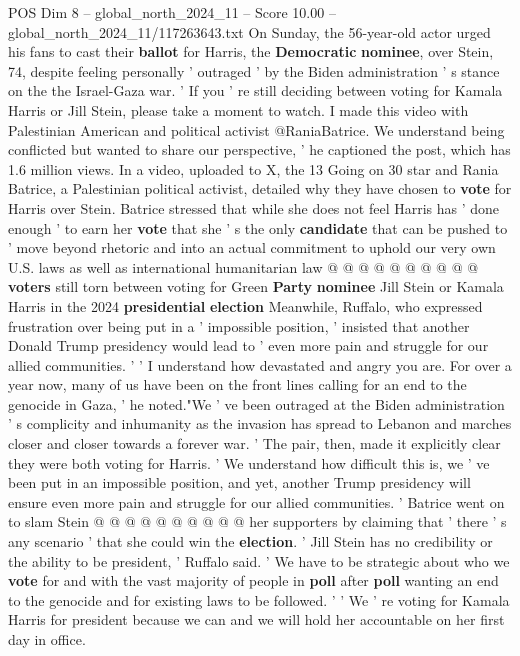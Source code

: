 \begin{textsample}{POS Dim 8 – global\_north\_2024\_11 – Score 10.00 – global\_north\_2024\_11/117263643.txt}  \label{ex:f8_pos_157}
On Sunday, the 56-year-old actor urged his fans to cast their \textbf{ballot} for Harris, the \textbf{Democratic} \textbf{nominee}, over Stein, 74, despite feeling personally ' outraged ' by the Biden administration ' s stance on the the Israel-Gaza war. ' If you ' re still deciding between voting for Kamala Harris or Jill Stein, please take a moment to watch.
I made this video with Palestinian American and political activist @RaniaBatrice.
We understand being conflicted but wanted to share our perspective, ' he captioned the post, which has 1.6 million views.
In a video, uploaded to X, the 13 Going on 30 star and Rania Batrice, a Palestinian political activist, detailed why they have chosen to \textbf{vote} for Harris over Stein.
Batrice stressed that while she does not feel Harris has ' done enough ' to earn her \textbf{vote} that she ' s the only \textbf{candidate} that can be pushed to ' move beyond rhetoric and into an actual commitment to uphold our very own U.S. laws as well as international humanitarian law @ @ @ @ @ @ @ @ @ @ \textbf{voters} still torn between voting for Green \textbf{Party} \textbf{nominee} Jill Stein or Kamala Harris in the 2024 \textbf{presidential} \textbf{election} Meanwhile, Ruffalo, who expressed frustration over being put in a ' impossible position, ' insisted that another Donald Trump presidency would lead to ' even more pain and struggle for our allied communities. ' ' I understand how devastated and angry you are.
For over a year now, many of us have been on the front lines calling for an end to the genocide in Gaza, ' he noted."We ' ve been outraged at the Biden administration ' s complicity and inhumanity as the invasion has spread to Lebanon and marches closer and closer towards a forever war. ' The pair, then, made it explicitly clear they were both voting for Harris. ' We understand how difficult this is, we ' ve been put in an impossible position, and yet, another Trump presidency will ensure even more pain and struggle for our allied communities. ' Batrice went on to slam Stein @ @ @ @ @ @ @ @ @ @ her supporters by claiming that ' there ' s any scenario ' that she could win the \textbf{election}. ' Jill Stein has no credibility or the ability to be president, ' Ruffalo said. ' We have to be strategic about who we \textbf{vote} for and with the vast majority of people in \textbf{poll} after \textbf{poll} wanting an end to the genocide and for existing laws to be followed. ' ' We ' re voting for Kamala Harris for president because we can and we will hold her accountable on her first day in office.

\end{textsample}
